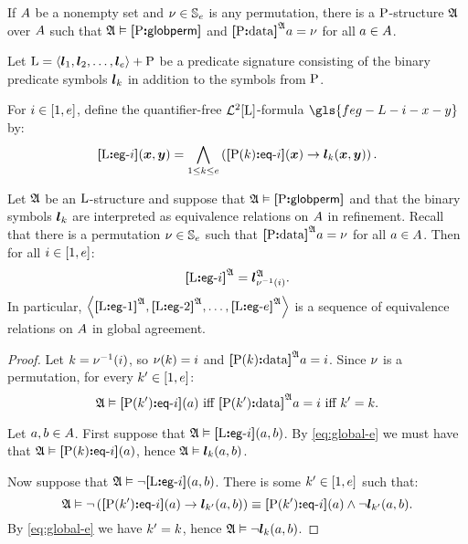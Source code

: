 If $A$ be a nonempty set and $\nu \in \mathbb{S}_{e}$ is any permutation,
there is a ${\mathrm{P}}$-structure $\mathfrak{A}$ over $A$ such that
$\mathfrak{A} \vDash {\bm{[}{\mathrm{P}}\mathord{\bm{:}}\mathsf{globperm}\bm{]}}$ and ${\bm{[}{\mathrm{P}}\mathord{\bm{:}}\mathrm{data}\bm{]}}^{\mathfrak{A}}a = \nu$ for all 
$a \in A$.

Let ${\mathrm{L}} = \left\langle \bm{l}_{1}, \bm{l}_{2}, \dots, \bm{l}_{e} \right\rangle + {\mathrm{P}}$ be a predicate
signature consisting of the binary predicate symbols $\bm{l}_{k}$ in addition to
the symbols from ${\mathrm{P}}$.

\begin{definition}
For $i \in [1, e]$, define the quantifier-free $\mathcal{L}^{2}[{\mathrm{L}}]$-formula
$\gls{feg-L-i-x-y}$ by:
\[
  {\bm{[}{\mathrm{L}}\mathord{\bm{:}}\mathsf{eg}{\hbox{-}}i\bm{]}}(\bm{x},\bm{y}) = \bigwedge_{1 \leq k \leq e}
  \left({\bm{[}{\mathrm{P}}(k)\mathord{\bm{:}}\mathsf{eq}{\hbox{-}}i\bm{]}}(\bm{x}) \rightarrow \bm{l}_{k}(\bm{x}, \bm{y})\right).
\]
\end{definition}
\begin{remark}\label{rem:global-e-m}
Let $\mathfrak{A}$ be an ${\mathrm{L}}$-structure and suppose that 
$\mathfrak{A} \vDash {\bm{[}{\mathrm{P}}\mathord{\bm{:}}\mathsf{globperm}\bm{]}}$
and that the binary symbols $\bm{l}_{k}$ are interpreted as equivalence relations
on $A$ in refinement.
Recall that there is a permutation $\nu \in \mathbb{S}_{e}$ such that
${\bm{[}{\mathrm{P}}\mathord{\bm{:}}\mathrm{data}\bm{]}}^{\mathfrak{A}}a =\nu$ for all $a \in A$.
Then for all $i \in [1, e]$:
\[
  {\bm{[}{\mathrm{L}}\mathord{\bm{:}}\mathsf{eg}{\hbox{-}}i\bm{]}}^{\mathfrak{A}} = \bm{l}_{\nu^{-1}(i)}^{\mathfrak{A}}.
\]
In particular,
$\left\langle {\bm{[}{\mathrm{L}}\mathord{\bm{:}}\mathsf{eg}{\hbox{-}}1\bm{]}}^{\mathfrak{A}}, {\bm{[}{\mathrm{L}}\mathord{\bm{:}}\mathsf{eg}{\hbox{-}}2\bm{]}}^{\mathfrak{A}}, \dots, {\bm{[}{\mathrm{L}}\mathord{\bm{:}}\mathsf{eg}{\hbox{-}}e\bm{]}}^{\mathfrak{A}} \right\rangle$ is
a sequence of equivalence relations on $A$ in global agreement.
\end{remark}
\begin{proof}
Let $k = \nu^{-1}(i)$, so $\nu(k) = i$ and
${\bm{[}{\mathrm{P}}(k)\mathord{\bm{:}}\mathrm{data}\bm{]}}^{\mathfrak{A}}a = i$.
Since $\nu$ is a permutation, for every ${k'} \in [1, e]$:
\begin{equation}\label{eq:global-e}
\mifff{
  \StrA \vDash \feqA{\PS(\kkp)}\ii(\ea)}{
  \data{\PSp\kkp}\StrA\ea = \ii}{
  \kkp = \kk}.
\end{equation}

Let $a, b \in A$.
First suppose that $\mathfrak{A} \vDash {\bm{[}{\mathrm{L}}\mathord{\bm{:}}\mathsf{eg}{\hbox{-}}i\bm{]}}(a,b)$.
By \cref{eq:global-e} we must have that ${\mathfrak{A} \vDash
{\bm{[}{\mathrm{P}}(k)\mathord{\bm{:}}\mathsf{eq}{\hbox{-}}i\bm{]}}(a)}$, hence $\mathfrak{A} \vDash \bm{l}_{k}(a,b)$.

Now suppose that $\mathfrak{A} \vDash \lnot{\bm{[}{\mathrm{L}}\mathord{\bm{:}}\mathsf{eg}{\hbox{-}}i\bm{]}}(a,b)$. There is some
${k'} \in [1, e]$ such that:
\[
  \mathfrak{A} \vDash \lnot\left({\bm{[}{\mathrm{P}}({k'})\mathord{\bm{:}}\mathsf{eq}{\hbox{-}}i\bm{]}}(a) \rightarrow
  \bm{l}_{{k'}}(a,b)\right) \equiv {\bm{[}{\mathrm{P}}({k'})\mathord{\bm{:}}\mathsf{eq}{\hbox{-}}i\bm{]}}(a) \land
  \lnot\bm{l}_{{k'}}(a,b).
\]
By \cref{eq:global-e} we have ${k'} = k$, hence
$\mathfrak{A} \vDash \lnot\bm{l}_{k}(a,b)$.
\end{proof}

